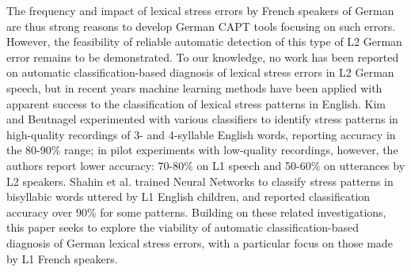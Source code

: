 \documentclass[a4paper]{article}
\newcommand{\TODO}[1]{{\color{red}\textbf{[TODO #1]}}}
\begin{document}
	
	The frequency and impact of lexical stress errors by French speakers of German are thus strong reasons to develop German CAPT tools focusing on such errors.
	However, the feasibility of reliable automatic detection of this type of L2 German error remains to be demonstrated. 
	To our knowledge, no work has been reported on automatic classification-based diagnosis of lexical stress errors in L2 German speech, 
	but in recent years machine learning methods have been applied with apparent success to the classification of lexical stress patterns in English. 
	Kim and Beutnagel \cite{Kim2011} experimented with various classifiers to identify stress patterns in high-quality recordings of 3- and 4-syllable English words, reporting accuracy in the 80-90\% range; in pilot experiments with low-quality recordings, however, the authors report lower accuracy: 70-80\% on L1 speech and 50-60\% on utterances by L2 speakers. 
	Shahin et al. \cite{Shahin2012a} trained Neural Networks to classify stress patterns in bisyllabic words uttered by L1 English children, 
	and reported classification accuracy over 90\% for some patterns. %
	Building on these related investigations, this paper seeks to explore the viability of automatic classification-based diagnosis of German lexical stress errors, with a particular focus on those made by L1 French speakers.
	
\end{document}
